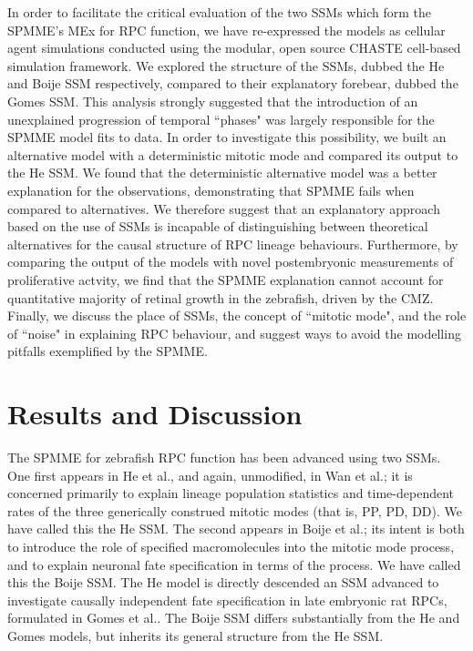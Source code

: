 \documentclass[10pt,letterpaper]{article}
\begin{document}
In order to facilitate the critical evaluation of the two SSMs which form the SPMME's MEx for RPC function, we have re-expressed the models as cellular agent simulations conducted using the modular, open source CHASTE cell-based simulation framework\cite{Mirams2013}. We explored the structure of the SSMs, dubbed the He and Boije SSM respectively, compared to their explanatory forebear, dubbed the Gomes SSM\cite{Gomes2011}. This analysis strongly suggested that the introduction of an unexplained progression of temporal ``phases" was largely responsible for the SPMME model fits to data. In order to investigate this possibility, we built an alternative model with a deterministic mitotic mode and compared its output to the He SSM. We found that the deterministic alternative model was a better explanation for the observations, demonstrating that SPMME fails when compared to alternatives. We therefore suggest that an explanatory approach based on the use of SSMs is incapable of distinguishing between theoretical alternatives for the causal structure of RPC lineage behaviours. Furthermore, by comparing the output of the models with novel postembryonic measurements of proliferative actvity, we find that the SPMME explanation cannot account for quantitative majority of retinal growth in the zebrafish, driven by the CMZ. Finally, we discuss the place of SSMs, the concept of ``mitotic mode", and the role of ``noise" in explaining RPC behaviour, and suggest ways to avoid the modelling pitfalls exemplified by the SPMME.

\section*{Results and Discussion}

The SPMME for zebrafish RPC function has been advanced using two SSMs. One first appears in He et al., and again, unmodified, in Wan et al.\cite{He2012,Wan2016}; it is concerned primarily to explain lineage population statistics and time-dependent rates of the three generically construed mitotic modes (that is, PP, PD, DD). We have called this the He SSM. The second appears in Boije et al.\cite{Boije2015}; its intent is both to introduce the role of specified macromolecules into the mitotic mode process, and to explain neuronal fate specification in terms of the process. We have called this the Boije SSM. The He model is directly descended an SSM advanced to investigate causally independent fate specification in late embryonic rat RPCs, formulated in Gomes et al.\cite{Gomes2011}. The Boije SSM differs substantially from the He and Gomes models, but inherits its general structure from the He SSM.
\end{document}
